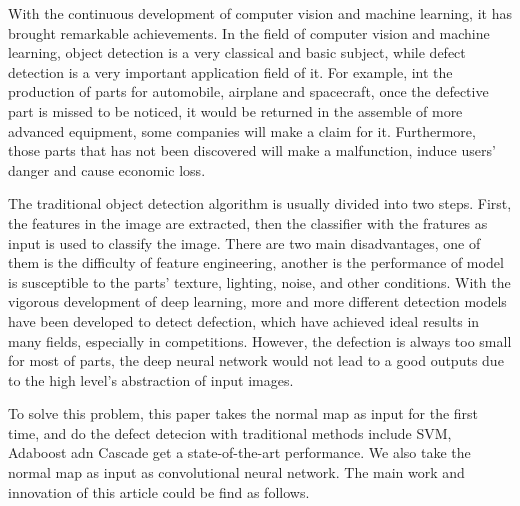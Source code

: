 \begin{englishabstract}

With the continuous development of computer vision and machine learning, it has brought remarkable achievements.
In the field of computer vision and machine learning, object detection is a very classical and basic subject, while defect detection is a very important application field of it. For example, int the production of parts for automobile, airplane and spacecraft, once the defective part is missed to be noticed,
 it would be returned in the assemble of more advanced equipment,
 some companies will make a claim for it. Furthermore, those parts that has not been discovered  will make a malfunction, induce users' danger and cause economic loss. 

The traditional object detection algorithm is usually divided into two steps. First, the features in the image are extracted, then the classifier with the fratures as input is used to classify the image. There are two main disadvantages, one of them is the difficulty of feature engineering, another is the performance of model is susceptible to the parts' texture, lighting, noise, and other conditions.
With the vigorous development of deep learning, more and more different detection models have been developed to detect defection, which have achieved ideal results in many fields, especially in competitions. However, the defection is always too small for most of parts, the deep neural network would not lead to a good outputs due to the high level's abstraction of input images.

To solve this problem, this paper takes the normal map as input for the first time, and do the defect detecion with traditional methods include SVM, Adaboost adn Cascade get a state-of-the-art performance. We also take the normal map as input as convolutional neural network.
The main work and innovation of this article could be find as follows.


\end{englishabstract}
